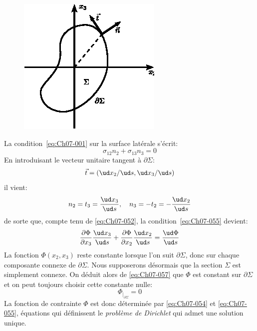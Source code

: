 \begin{figure}
    \begin{center}
        \includegraphics{../images/T1_Ch07-14}
    \end{center}
\end{figure}
\noindent La condition~\eqref{eq:Ch07-001} sur la surface latérale s'écrit:
\begin{equation}
    \sigma_{12} n_2 + \sigma_{13} n_3 = 0
    \label{eq:Ch07-055}
\end{equation}
En introduisant le vecteur unitaire tangent à $\partial \Sigma$:
\[
    \vec{t} = \left( \ud x_2 / \ud s, \ud x_3/\ud s \right)
\]
il vient:
\begin{equation}
    n_2 = t_3 = \frac{\ud x_3}{\ud s}, \quad n_3 = -t_2 = - \frac{\ud x_2}{\ud s}
    \label{eq:Ch07-056}
\end{equation}
de sorte que, compte tenu de \eqref{eq:Ch07-052}, la condition~\eqref{eq:Ch07-055} devient:
\begin{equation}
    \frac{\partial \Phi}{\partial x_3} \frac{\ud x_3}{\ud s} + \frac{\partial \Phi}{\partial x_2} \frac{\ud x_2}{\ud s} = \frac{\ud \Phi}{\ud s}
    \label{eq:Ch07-057}
\end{equation}
La fonction $\Phi\left( x_2, x_3 \right)$ reste constante lorsque l'on suit $\partial \Sigma$, donc sur chaque composante connexe de $\partial \Sigma$.
Nous supposerons désormais que la section $\Sigma$ est simplement connexe.
On déduit alors de \eqref{eq:Ch07-057} que $\Phi$ est constant sur $\partial \Sigma$ et on peut toujours choisir cette constante nulle:
\begin{equation}
    \Phi_{|_{\partial \Sigma}} = 0
    \label{eq:Ch07-058}
\end{equation}
La fonction de contrainte $\Phi$ est donc déterminée par \eqref{eq:Ch07-054} et \eqref{eq:Ch07-055}, équations qui définissent le \emph{problème de Dirichlet} qui admet une solution unique.
